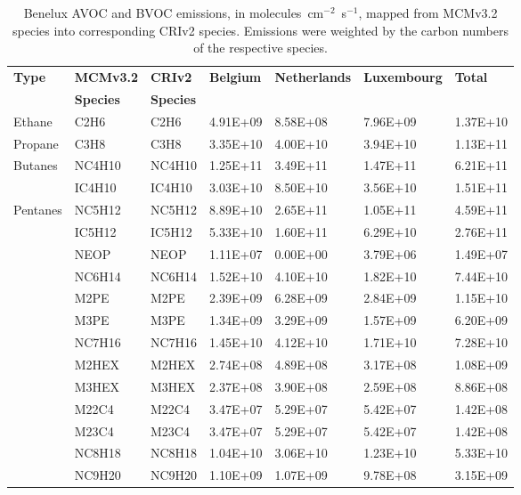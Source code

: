 \footnotesize
\begin{longtable}{lllllll}
	\caption{Benelux AVOC and BVOC emissions, in molecules~cm$^{-2}$~s$^{-1}$, mapped from MCMv3.2 species into corresponding CRIv2 species. Emissions were weighted by the carbon numbers of the respective species.}\\%
	\hline \hline
	\multirow{2}{*}{\textbf{Type}} & \textbf{MCMv3.2} & \textbf{CRIv2} & \multirow{2}{*}{\textbf{Belgium}} & \multirow{2}{*}{\textbf{Netherlands}} & \multirow{2}{*}{\textbf{Luxembourg}} & \multirow{2}{*}{\textbf{Total}} \\
 & \textbf{Species} & \textbf{Species} & & & & \\
	\endhead
	\hline
	Ethane & C2H6 & C2H6 & 4.91E+09 & 8.58E+08 & 7.96E+09 & 1.37E+10 \\
	\hline Propane & C3H8 & C3H8 & 3.35E+10 & 4.00E+10 & 3.94E+10 & 1.13E+11 \\ \hline
	\multirow{2}{*}{Butanes} & NC4H10 & NC4H10 & 1.25E+11 & 3.49E+11 & 1.47E+11 & 6.21E+11 \\
	 & IC4H10 & IC4H10 & 3.03E+10 & 8.50E+10 & 3.56E+10 & 1.51E+11 \\
	\hline \multirow{3}{*}{Pentanes} & NC5H12 & NC5H12 & 8.89E+10 & 2.65E+11 & 1.05E+11 & 4.59E+11 \\
	 & IC5H12 & IC5H12 & 5.33E+10 & 1.60E+11 & 6.29E+10 & 2.76E+11 \\
	 & NEOP & NEOP & 1.11E+07 & 0.00E+00 & 3.79E+06 & 1.49E+07 \\
	\hline \parbox[t]{2mm}{} & NC6H14 & NC6H14 & 1.52E+10 & 4.10E+10 & 1.82E+10 & 7.44E+10 \\
	 & M2PE & M2PE & 2.39E+09 & 6.28E+09 & 2.84E+09 & 1.15E+10 \\
	 & M3PE & M3PE & 1.34E+09 & 3.29E+09 & 1.57E+09 & 6.20E+09 \\
	 & NC7H16 & NC7H16 & 1.45E+10 & 4.12E+10 & 1.71E+10 & 7.28E+10 \\
	 & M2HEX & M2HEX & 2.74E+08 & 4.89E+08 & 3.17E+08 & 1.08E+09 \\
	 & M3HEX & M3HEX & 2.37E+08 & 3.90E+08 & 2.59E+08 & 8.86E+08 \\
	 & M22C4 & M22C4 & 3.47E+07 & 5.29E+07 & 5.42E+07 & 1.42E+08 \\
	 & M23C4 & M23C4 & 3.47E+07 & 5.29E+07 & 5.42E+07 & 1.42E+08 \\
	 & NC8H18 & NC8H18 & 1.04E+10 & 3.06E+10 & 1.23E+10 & 5.33E+10 \\
	 & NC9H20 & NC9H20 & 1.10E+09 & 1.07E+09 & 9.78E+08 & 3.15E+09 \\

\end{longtable}
